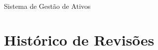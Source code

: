 \documentclass[12pt, a4paper]{article}
\newcommand{\companyAddress}{Sistema de Gestão de Ativos}
\begin{document}
\begin{titlepage}
    \vspace{1cm}

    \centering
    \small

    \companyAddress \\ 

\end{titlepage}

\newpage
\tableofcontents
\newpage

\listoffigures 
\newpage 

\section*{Histórico de Revisões}
\vspace{0.5cm} 
\end{document}
